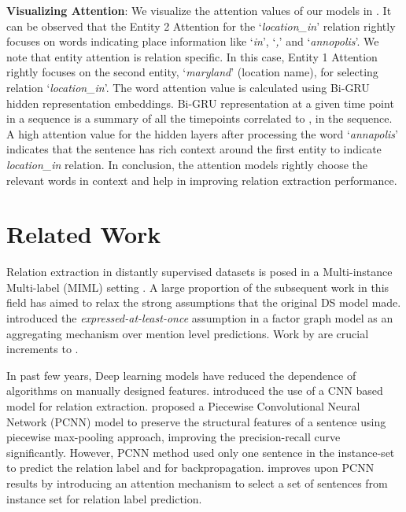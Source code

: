 \documentclass{article}
\begin{document}
\textbf{Visualizing Attention}: We visualize the attention values of our models in . It can be observed that the Entity 2 Attention for the `\textit{location\_in}' relation rightly focuses on words indicating place information like `\textit{in}', `\textit{,}' and `\textit{annopolis}'. We note that entity attention is relation specific. In this case, Entity 1 Attention rightly focuses on the second entity,  `\textit{maryland}' (location name), for selecting relation `\textit{location\_in}'.  The word attention value is calculated using Bi-GRU hidden representation embeddings. Bi-GRU representation at a given time point  in a sequence is a summary of all the timepoints correlated to , in the sequence. A high attention value for the hidden layers after processing the word `\textit{annapolis}' indicates that the sentence has rich context around the first entity to indicate \textit{location\_in} relation. In conclusion, the attention models rightly choose the relevant words in context and help in improving relation extraction performance.


 \section{Related Work}

 Relation extraction in distantly supervised datasets is posed in a Multi-instance Multi-label (MIML) setting \cite{surdeanu:2012}. A large proportion of the subsequent work in this field has aimed to relax the strong assumptions that the original DS model made. \cite{riedel:2010} introduced the \textit{expressed-at-least-once} assumption in a factor graph model as an aggregating mechanism over mention level predictions. Work by \cite{hoffmann:2011,surdeanu:2012,ritter:2013} are crucial increments to \cite{riedel:2010}. 

 In past few years, Deep learning models \cite{Bengio:2009:LDA:1658423.1658424} have reduced the dependence of algorithms on manually designed features. \cite{zeng:2014} introduced the use of a CNN based model for relation extraction. \cite{zeng:2015} proposed a Piecewise Convolutional Neural Network (PCNN) model to preserve the structural features of a sentence using piecewise max-pooling approach, improving the precision-recall curve significantly. However, PCNN method used only one sentence in the instance-set to predict the relation label and for backpropagation. \cite{nre-lin} improves upon PCNN results by introducing an attention mechanism to select a set of sentences from instance set for relation label prediction.
\end{document}
